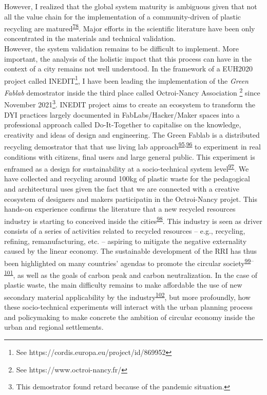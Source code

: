 \documentclass[
  11pt,
  a4paperpaper,
  onecolumn]{article}
\begin{document}
However, I realized that the global system maturity is ambiguous given
that not all the value chain for the implementation of a
community-driven of plastic recycling are
matured\textsuperscript{\protect\hyperlink{ref-CruzSanchez2020}{78}}.
Major efforts in the scientific literature have been only concentrated
in the materials and technical validation.\\
However, the system validation remains to be difficult to implement.
More important, the analysis of the holistic impact that this process
can have in the context of a city remains not well understood. In the
framework of a EUH2020 project called INEDIT\footnote{See
  https://cordis.europa.eu/project/id/869952}, I have been leading the
implementation of the \emph{Green Fablab} demostrator inside the third
place called Octroi-Nancy Association \footnote{See
  https://www.octroi-nancy.fr/} since November 2021\footnote{This
  demostrator found retard because of the pandemic situation.}. INEDIT
project aims to create an ecosystem to transform the DYI practices
largely documented in FabLabs/Hacker/Maker spaces into a professional
approach called Do-It-Together to capitalise on the knowledge,
creativity and ideas of design and engineering. The Green Fablab is a
distributed recycling demostrator that that use living lab
approach\textsuperscript{\protect\hyperlink{ref-tyl2021}{95},\protect\hyperlink{ref-compagnucci2020a}{96}}
to experiment in real conditions with citizens, final users and large
general public. This experiment is enframed as a design for
sustainability at a socio-technical system
level\textsuperscript{\protect\hyperlink{ref-Ceschin2016}{97}}. We have
collected and recycling around 100kg of plastic waste for the
pedagogical and architectural uses given the fact that we are connected
with a creative ecosystem of designers and makers participatin in the
Octroi-Nancy projet. This hands-on experience confirms the literature
that a new recycled resources industry is starting to conceived inside
the cities\textsuperscript{\protect\hyperlink{ref-wang2019b}{98}}. This
industry is seen as driver consists of a series of activities related to
recycled resources -- e.g., recycling, refining, remanufacturing, etc.
-- aspiring to mitigate the negative externality caused by the linear
economy. The sustainable development of the RRI has thus been
highlighted on many countries' agendas to promote the circular
society\textsuperscript{\protect\hyperlink{ref-leipold2021}{99}--\protect\hyperlink{ref-jaeger-erben2021a}{101}},
as well as the goals of carbon peak and carbon neutralization. In the
case of plastic waste, the main difficulty remains to make affordable
the use of new secondary material applicability by the
industry\textsuperscript{\protect\hyperlink{ref-klotz2022}{102}}, but
more profoundly, how these socio-technical experiments will interact
with the urban planning process and policymaking to make concrete the
ambition of circular economy inside the urban and regional settlements.
\end{document}
